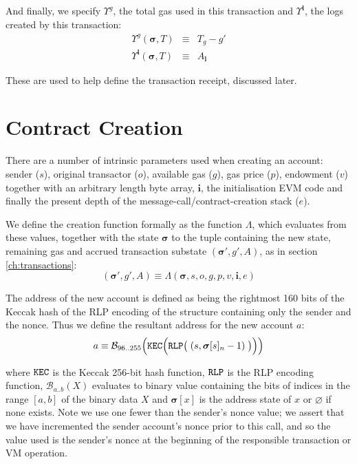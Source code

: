\documentclass[9pt,oneside]{amsart}
\begin{document}
\begin{multicols}{2}
And finally, we specify $\Upsilon^g$, the total gas used in this transaction and $\Upsilon^\mathbf{l}$, the logs created by this transaction:
\begin{eqnarray}
\Upsilon^g(\boldsymbol{\sigma}, T) & \equiv & T_g - g' \\
\Upsilon^\mathbf{l}(\boldsymbol{\sigma}, T) & \equiv & A_\mathbf{l}
\end{eqnarray}

These are used to help define the transaction receipt, discussed later.

\section{Contract Creation} \label{ch:create}

There are a number of intrinsic parameters used when creating an account: sender ($s$), original transactor ($o$), available gas ($g$), gas price ($p$), endowment ($v$) together with an arbitrary length byte array, $\mathbf{i}$, the initialisation EVM code and finally the present depth of the message-call/contract-creation stack ($e$).

We define the creation function formally as the function $\Lambda$, which evaluates from these values, together with the state $\boldsymbol{\sigma}$ to the tuple containing the new state, remaining gas and accrued transaction substate $(\boldsymbol{\sigma}', g', A)$, as in section \ref{ch:transactions}:
\begin{equation}
(\boldsymbol{\sigma}', g', A) \equiv \Lambda(\boldsymbol{\sigma}, s, o, g, p, v, \mathbf{i}, e)
\end{equation}

The address of the new account is defined as being the rightmost 160 bits of the Keccak hash of the RLP encoding of the structure containing only the sender and the nonce. Thus we define the resultant address for the new account $a$:
\begin{equation}
a \equiv \mathcal{B}_{96..255}\Big(\mathtt{\tiny KEC}\Big(\mathtt{\tiny RLP}\big(\;(s, \boldsymbol{\sigma}[s]_n - 1)\;\big)\Big)\Big)
\end{equation}

where $\mathtt{\tiny KEC}$ is the Keccak 256-bit hash function, $\mathtt{\tiny RLP}$ is the RLP encoding function, $\mathcal{B}_{a..b}(X)$ evaluates to binary value containing the bits of indices in the range $[a, b]$ of the binary data $X$ and $\boldsymbol{\sigma}[x]$ is the address state of $x$ or $\varnothing$ if none exists. Note we use one fewer than the sender's nonce value; we assert that we have incremented the sender account's nonce prior to this call, and so the value used is the sender's nonce at the beginning of the responsible transaction or VM operation.


\end{multicols}
\end{document}
